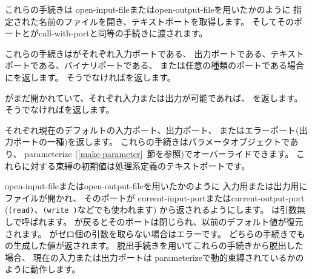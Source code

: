 \begin{entry}{%
}

これらの手続きは
{\cf open-input-file}または{\cf open-\+output-\+file}を用いたかのように
指定された名前のファイルを開き、テキストポートを取得します。
そしてそのポートとが{\cf call-\+with-\+port}と同等の手続きに渡されます。
\end{entry}

\begin{entry}{%
}

これらの手続きはがそれぞれ入力ポートである、
出力ポートである、テキストポートである、バイナリポートである、
または任意の種類のポートである場合に\schtrue{}を返します。
そうでなければ\schfalse{}を返します。

\end{entry}


\begin{entry}{%
}

がまだ開かれていて、それぞれ入力または出力が可能であれば、
\schtrue{}を返します。 そうでなければ\schfalse{}を返します。


\end{entry}


\begin{entry}{%
}

それぞれ現在のデフォルトの入力ポート、出力ポート、
またはエラーポート(出力ポートの一種)を返します。
これらの手続きはパラメータオブジェクトであり、
{\cf parameterize} (\ref{make-parameter}~節を参照)でオーバーライドできます。
これらに対する束縛の初期値は処理系定義のテキストポートです。

\end{entry}


\begin{entry}{%
}

{\cf open-input-file}または{\cf open-output-file}を用いたかのように
入力用または出力用にファイルが開かれ、
そのポートが
{\cf current-input-port}または{\cf current-output-port}
({\tt (read)}、{\tt (write )}などでも使われます)
から返されるようにします。
は引数無しで呼ばれます。
が戻るとそのポートは閉じられ、以前のデフォルト値が復元されます。
がゼロ個の引数を取らない場合はエラーです。
どちらの手続きでもの生成した値が返されます。
脱出手続きを用いてこれらの手続きから脱出した場合、
現在の入力または出力ポートは
{\cf parameterize}で動的束縛されているかのように動作します。


\end{entry}



